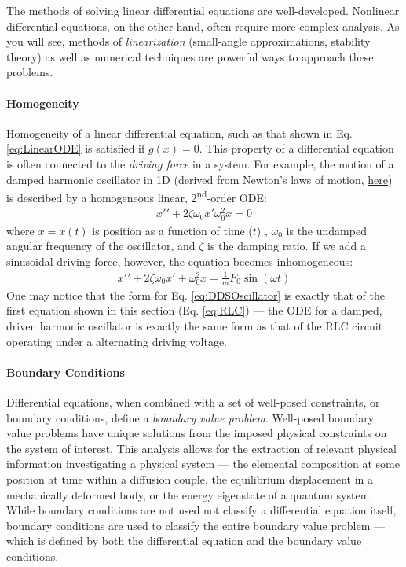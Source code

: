 The methods of solving linear differential equations are well-developed. Nonlinear differential equations, on the other hand, often require more complex analysis. As you will see, methods of \textit{linearization} (small-angle approximations, stability theory) as well as numerical techniques are powerful ways to approach these problems.
			
			\paragraph{Homogeneity ---} Homogeneity of a linear differential equation, such as that shown in Eq. \ref{eq:LinearODE} is satisfied if $g(x) = 0$. This property of a differential equation is often connected to the \textit{driving force} in a system. For example, the motion of a damped harmonic oscillator in 1D (derived from Newton's laws of motion, \href{https://en.wikipedia.org/wiki/Harmonic_oscillator}{here}) is described by a homogeneous linear, 2\textsuperscript{nd}-order ODE:
%			
\begin{align}
	x\prime\prime+2\zeta \omega_0 x\prime \omega_0^2 x = 0
\end{align}
%
where $x = x(t)$ is position as a function of time ($t$) , $\omega_0$ is the undamped angular frequency of the oscillator, and $\zeta$ is the damping ratio. If we add a sinusoidal driving force, however, the equation becomes inhomogeneous:
%
\begin{align}
	x\prime\prime+2\zeta \omega_0 x\prime + \omega_0^2 x = \frac{1}{m} F_0 \sin{(\omega t)} \label{eq:DDSOscillator}
\end{align}
%
One may notice that the form for Eq. \ref{eq:DDSOscillator} is exactly that of the first equation shown in this section (Eq. \ref{eq:RLC}) --- the ODE for a damped, driven harmonic oscillator is exactly the same form as that of the RLC circuit operating under a alternating driving voltage. 
%
	\paragraph{Boundary Conditions ---} Differential equations, when combined with a set of well-posed constraints, or boundary conditions, define a \textit{boundary value problem}. Well-posed boundary value problems have unique solutions from the imposed physical constraints on the system of interest. This analysis allows for the extraction of relevant physical information investigating a physical system --- the elemental composition at some position at time within a diffusion couple, the equilibrium displacement in a mechanically deformed body, or the energy eigenstate of a quantum system. While boundary conditions are not used not classify a differential equation itself, boundary conditions are used to classify the entire boundary value problem --- which is defined by both the differential equation and the boundary value conditions.
	
